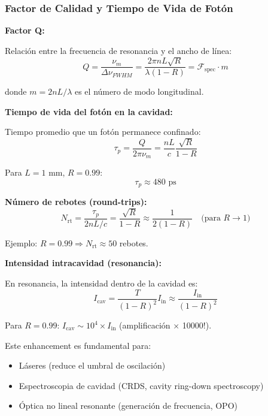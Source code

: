 \documentclass[11pt,a4paper]{article}
\begin{document}
\subsubsection{Factor de Calidad y Tiempo de Vida de Fotón}

\textbf{Factor Q:}

Relación entre la frecuencia de resonancia y el ancho de línea:
\begin{equation}
    Q = \frac{\nu_m}{\Delta\nu_{FWHM}} = \frac{2\pi nL\sqrt{R}}{\lambda(1-R)} = \mathcal{F}_{\text{spec}} \cdot m
\end{equation}

donde $m = 2nL/\lambda$ es el número de modo longitudinal.

\textbf{Tiempo de vida del fotón en la cavidad:}

Tiempo promedio que un fotón permanece confinado:
\begin{equation}
    \tau_p = \frac{Q}{2\pi\nu_m} = \frac{nL}{c}\frac{\sqrt{R}}{1-R}
\end{equation}

Para $L = 1$ mm, $R = 0.99$:
\begin{equation}
    \tau_p \approx 480 \text{ ps}
\end{equation}

\textbf{Número de rebotes (round-trips):}
\begin{equation}
    N_{\text{rt}} = \frac{\tau_p}{2nL/c} = \frac{\sqrt{R}}{1-R} \approx \frac{1}{2(1-R)} \quad \text{(para } R \to 1\text{)}
\end{equation}

Ejemplo: $R = 0.99 \Rightarrow N_{\text{rt}} \approx 50$ rebotes.

\begin{importante}
\textbf{Intensidad intracavidad (resonancia):}

En resonancia, la intensidad dentro de la cavidad es:
\begin{equation}
    I_{\text{cav}} = \frac{T}{(1-R)^2}I_{\text{in}} \approx \frac{I_{\text{in}}}{(1-R)^2}
\end{equation}

Para $R = 0.99$: $I_{\text{cav}} \sim 10^4 \times I_{\text{in}}$ (amplificación × 10000!).

Este enhancement es fundamental para:
\begin{itemize}
    \item Láseres (reduce el umbral de oscilación)
    \item Espectroscopia de cavidad (CRDS, cavity ring-down spectroscopy)
    \item Óptica no lineal resonante (generación de frecuencia, OPO)
\end{itemize}
\end{importante}
\end{document}
